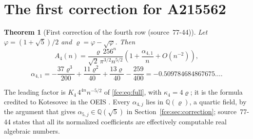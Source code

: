 \documentclass[11pt,a4paper]{article}
\numberwithin{equation}{section}
\newtheorem{theorem}{Theorem}[section]
\theoremstyle{definition}\newtheorem{definition}[theorem]{Definition}
\theoremstyle{remark}\newtheorem{remark}[theorem]{Remark}
\newcommand{\Q}{\mathbb Q}
\begin{document}
\section{The first correction for A215562}\label{fce:ba:sec:alpha41}
\begin{theorem}[First correction of the fourth row (source~77-44)]\label{fce:ba:thm:alpha41}
Let $\varphi=(1+\sqrt5)/2$ and $\varrho=\varphi-\sqrt\varphi$. Then
\begin{equation}\label{fce:ba:eq:four}
 A_4(n)=\frac{\varrho\,256^n}{\sqrt2\,\pi^{3/2}n^{5/2}}
 \left(1+\frac{\alpha_{4,1}}n+O(n^{-2})\right),
\end{equation}
\begin{equation}\label{fce:ba:eq:alpha41}
 \alpha_{4,1}=-\frac{37\varrho^3}{200}+\frac{11\varrho^2}{40}
              +\frac{13\varrho}{40}-\frac{259}{400}
            =-0.509784684867675\ldots .
\end{equation}
\end{theorem}
The leading factor is $K_4\,4^{4n}n^{-5/2}$ of \eqref{fce:eq:full}, with
$\kappa_4=4\varrho$; it is the formula credited to Kotesovec in the OEIS
\cite{oeis4}. Every $\alpha_{4,j}$ lies in $\Q(\varrho)$, a quartic field,
by the argument that gives $\alpha_{5,j}\in\Q(\sqrt5)$ in
Section~\ref{fce:sec:correction}; source~77-44 states that all its
normalized coefficients are effectively computable real algebraic numbers.
\end{document}

